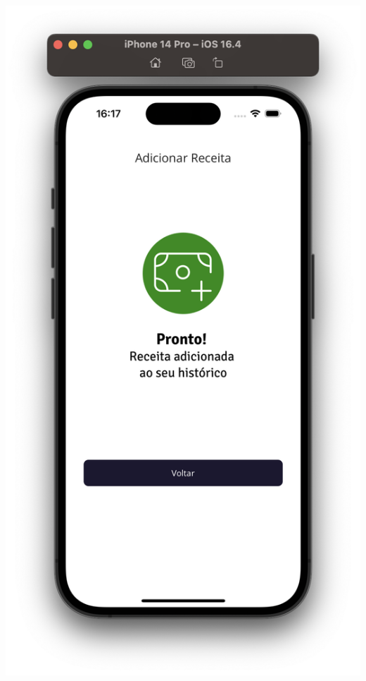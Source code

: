 \begin{center}
\begin{minipage}{0.4\textwidth}
            \label{fig:figura26}
        \end{minipage}%
        \begin{minipage}{0.4\textwidth}
            \centering
            \includegraphics[scale=0.15]{figs/figura27.png}
            \label{fig:figura27}
        \end{minipage}%
    \end{center}

